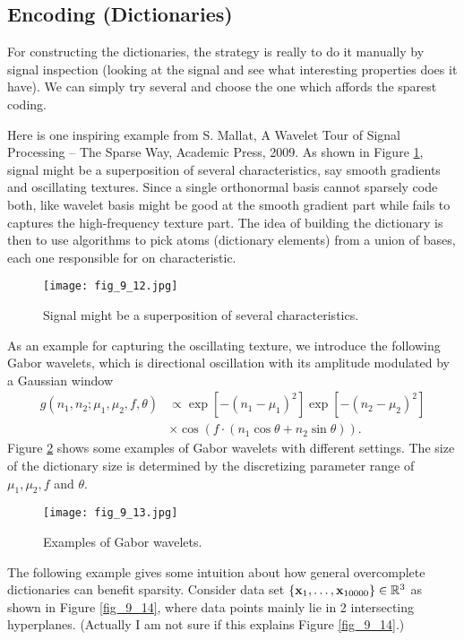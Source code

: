 \documentclass[../book-template.tex]{subfiles}
\begin{document}
\subsection{Encoding (Dictionaries)}
For constructing the dictionaries, the strategy is really to do it manually by signal inspection (looking at the signal and see what interesting properties does it have). We can simply try several and choose the one which affords the sparest coding. 
\par Here is one inspiring example from S. Mallat, A Wavelet Tour of Signal Processing – The Sparse Way, Academic Press, 2009. As shown in Figure \ref{fig_9_12}, signal might be a superposition of several characteristics, say smooth gradients and oscillating textures. Since a single orthonormal basis cannot sparsely code both, like wavelet basis might be good at the smooth gradient part while fails to captures the high-frequency texture part. The idea of building the dictionary is then to use algorithms to pick atoms (dictionary elements) from a union of bases, each one responsible for on characteristic.
\begin{figure}[h] 
	\centering 
	\texttt{[image: fig\_9\_12.jpg]} 
	\caption{Signal might be a superposition of several characteristics.}\label{fig_9_12}
\end{figure}
\par As an example for capturing the oscillating texture, we introduce the following Gabor wavelets, which is directional oscillation with its amplitude modulated by a Gaussian window
\begin{align*}
	g(n_1,n_2;\mu_1,\mu_2,f,\theta)&\propto \exp[-(n_1-\mu_1)^2]\exp[-(n_2-\mu_2)^2]\\
	&\times\cos(f\cdot(n_1\cos \theta+n_2\sin\theta)).
\end{align*}
Figure \ref{fig_9_13} shows some examples of Gabor wavelets with different settings. The size of the dictionary size is determined by the discretizing parameter range of $\mu_1,\mu_2,f$ and $\theta$.
\begin{figure}[h] 
	\centering 
	\texttt{[image: fig\_9\_13.jpg]} 
	\caption{Examples of Gabor wavelets.}\label{fig_9_13}
\end{figure}
\par The following example gives some intuition about how general overcomplete dictionaries can benefit sparsity. Consider data set $\{{\bf x}_1,\dots,{\bf x}_{10000}\}\in \mathbb{R}^3$ as shown in Figure \ref{fig_9_14}, where data points mainly lie in 2 intersecting hyperplanes. (Actually I am not sure if this explains Figure \ref{fig_9_14}.)
\end{document}
